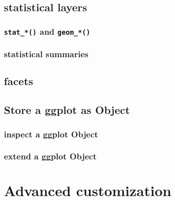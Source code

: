 \documentclass[
]{book}
\begin{document}
\hypertarget{statistical-layers}{%
\subsection*{statistical layers}\label{statistical-layers}}

\hypertarget{stat_-and-geom_}{%
\subsubsection*{\texorpdfstring{\texttt{stat\_*()} and \texttt{geom\_*()}}{stat\_*() and geom\_*()}}\label{stat_-and-geom_}}

\hypertarget{statistical-summaries}{%
\subsubsection*{statistical summaries}\label{statistical-summaries}}

\hypertarget{facets}{%
\subsection*{facets}\label{facets}}

\hypertarget{store-a-ggplot-as-object}{%
\subsection*{Store a ggplot as Object}\label{store-a-ggplot-as-object}}

\hypertarget{inspect-a-ggplot-object}{%
\subsubsection*{inspect a ggplot Object}\label{inspect-a-ggplot-object}}

\hypertarget{extend-a-ggplot-object}{%
\subsubsection*{extend a ggplot Object}\label{extend-a-ggplot-object}}

\hypertarget{advanced-customization-1}{%
\section{Advanced customization}\label{advanced-customization-1}}
\end{document}
